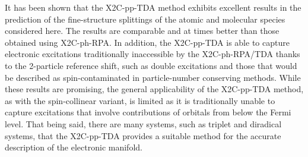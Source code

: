 It has been shown that the X2C-pp-TDA method exhibits excellent results in the prediction of the fine-structure splittings of the atomic and molecular species considered here.
The results are comparable and at times better than those obtained using X2C-ph-RPA.\cite{Li16_3711}
In addition, the X2C-pp-TDA is able to capture electronic excitations traditionally inaccessible by the X2C-ph-RPA/TDA thanks to the 2-particle reference shift, such as double excitations and those that would be described as spin-contaminated in particle-number conserving methods.
While these results are promising, the general applicability of the X2C-pp-TDA method, as with the spin-collinear variant, is limited as it is traditionally unable to capture excitations that involve contributions of orbitals from below the Fermi level.
That being said, there are many systems, such as triplet and diradical systems, that the X2C-pp-TDA provides a suitable method for the accurate description of the
electronic manifold.

